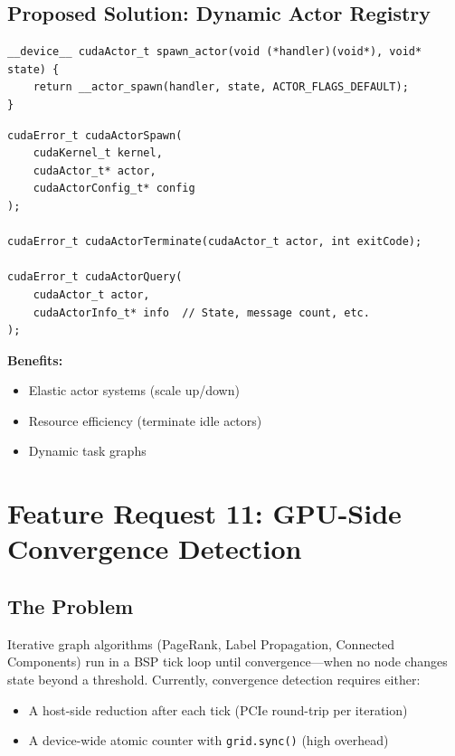 \documentclass[11pt,a4paper]{article}
\newenvironment{benefitsbox}{%
    \vspace{6pt}%
    \noindent\textbf{Benefits:}%
    \begin{itemize}[leftmargin=1.5em,topsep=2pt,itemsep=1pt]%
}{%
    \end{itemize}%
    \vspace{6pt}%
}
\begin{document}
\subsection{Proposed Solution: Dynamic Actor Registry}

\begin{lstlisting}[style=cstyle,title={Device-side actor creation}]
__device__ cudaActor_t spawn_actor(void (*handler)(void*), void* state) {
    return __actor_spawn(handler, state, ACTOR_FLAGS_DEFAULT);
}
\end{lstlisting}

\begin{lstlisting}[style=cstyle,title={Host-side actor management}]
cudaError_t cudaActorSpawn(
    cudaKernel_t kernel,
    cudaActor_t* actor,
    cudaActorConfig_t* config
);

cudaError_t cudaActorTerminate(cudaActor_t actor, int exitCode);

cudaError_t cudaActorQuery(
    cudaActor_t actor,
    cudaActorInfo_t* info  // State, message count, etc.
);
\end{lstlisting}

\begin{benefitsbox}
    \item Elastic actor systems (scale up/down)
    \item Resource efficiency (terminate idle actors)
    \item Dynamic task graphs
\end{benefitsbox}

\newpage

\section{Feature Request 11: GPU-Side Convergence Detection}

\subsection{The Problem}

Iterative graph algorithms (PageRank, Label Propagation, Connected Components) run in a BSP tick loop until convergence---when no node changes state beyond a threshold. Currently, convergence detection requires either:

\begin{itemize}[leftmargin=*]
    \item A host-side reduction after each tick (PCIe round-trip per iteration)
    \item A device-wide atomic counter with \texttt{grid.sync()} (high overhead)
\end{itemize}
\end{document}
